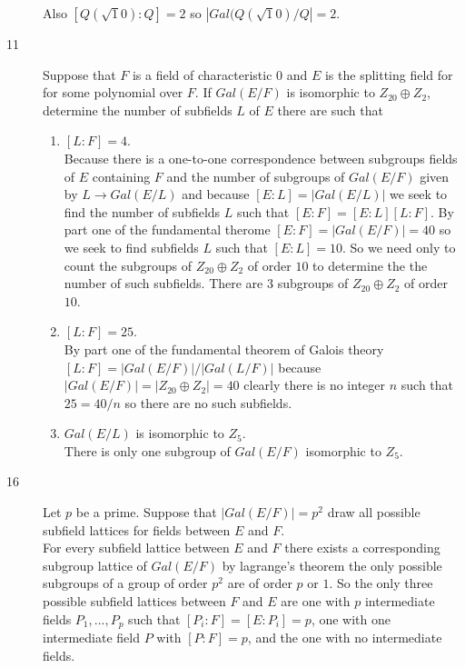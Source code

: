 \documentclass[11pt]{article}
\begin{document}
\begin{description}
	Also $[Q(\sqrt10):Q] = 2$ so $|Gal(Q(\sqrt10)/Q| = 2$.
\item[11]
	Suppose that $F$ is a field of characteristic $0$ and $E$ is the
	splitting field for for some polynomial over $F$. If $Gal(E/F)$ is
	isomorphic to $Z_{20} \oplus Z_2$, determine the number of subfields 
	$L$ of $E$ there are such that 
	\begin{enumerate}
		\item $[L:F] = 4$.\\
			Because there is a one-to-one correspondence between
			subgroups fields of $E$ containing $F$ and the number of
			subgroups of $Gal(E/F) $ given by $L \rightarrow
			Gal(E/L)$ and because $[E:L] = |Gal(E/L)|$ we seek to
			find the number of subfields $L$ such that $[E:F] =
			[E:L][L:F]$. By part one of the fundamental therome
			$[E:F] = |Gal(E/F)| = 40$ so we seek to find subfields
			$L$ such that $[E:L] = 10$.
			So we need only to count the 
			subgroups of $Z_{20}\oplus Z_2$ of order $10$ to determine the 
			the number of such subfields. There are $3$ subgroups
			of $Z_{20}\oplus Z_2$ of order $10$.
		\item $[L:F] = 25$.\\
			By part one of the fundamental theorem of Galois theory $[L:F] = |Gal(E/F)|/|Gal(L/F)|$ because
			$|Gal(E/F)| = |Z_{20} \oplus Z_2| =  40 $ clearly there
			is no integer $n$ such that $25 = 40/n$ so there are no such
			subfields.
		
		\item $Gal(E/L)$ is isomorphic to $Z_5$.\\ There is only one
			subgroup of $Gal(E/F)$ isomorphic to $Z_5$.
	\end{enumerate}
\item[16] Let $p$ be a prime. Suppose that $|Gal(E/F)| = p^2$ draw all possible
	subfield lattices for fields between $E$ and $F$.\\
	For every subfield lattice between $E$ and $F$ there exists a
	corresponding subgroup lattice of $Gal(E/F)$ by lagrange's theorem the
	only possible subgroups of a group of order $p^2$ are of order $p$ or
	$1$. So the only three possible subfield lattices between $F$ and $E$ are
	one with $p$ intermediate fields $P_1,...,P_p$ such that
	$[P_i:F]=[E:P_i] = p$, one with one intermediate field $P$ with
	$[P:F]=p$, and the one with no intermediate fields.

\end{description}
\end{document}
